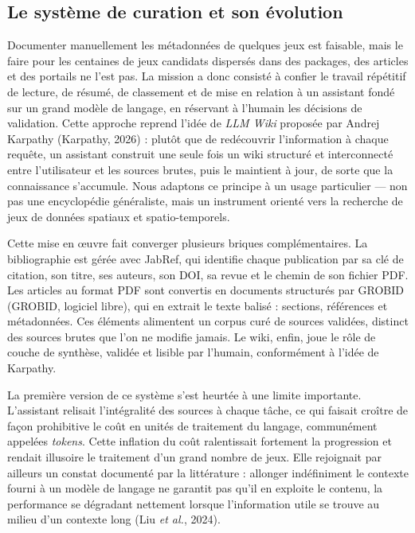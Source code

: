 \documentclass[11pt,a4paper]{article}
\begin{document}
\subsection{Le système de curation et son évolution}

Documenter manuellement les métadonnées de quelques jeux est faisable, mais le faire pour les centaines de jeux candidats dispersés dans des packages, des articles et des portails ne l'est pas. La mission a donc consisté à confier le travail répétitif de lecture, de résumé, de classement et de mise en relation à un assistant fondé sur un grand modèle de langage, en réservant à l'humain les décisions de validation. Cette approche reprend l'idée de \textit{LLM Wiki} proposée par Andrej Karpathy (Karpathy, 2026) : plutôt que de redécouvrir l'information à chaque requête, un assistant construit une seule fois un wiki structuré et interconnecté entre l'utilisateur et les sources brutes, puis le maintient à jour, de sorte que la connaissance s'accumule. Nous adaptons ce principe à un usage particulier --- non pas une encyclopédie généraliste, mais un instrument orienté vers la recherche de jeux de données spatiaux et spatio-temporels.

Cette mise en \oe uvre fait converger plusieurs briques complémentaires. La bibliographie est gérée avec JabRef, qui identifie chaque publication par sa clé de citation, son titre, ses auteurs, son DOI, sa revue et le chemin de son fichier PDF. Les articles au format PDF sont convertis en documents structurés par GROBID (GROBID, logiciel libre), qui en extrait le texte balisé : sections, références et métadonnées. Ces éléments alimentent un corpus curé de sources validées, distinct des sources brutes que l'on ne modifie jamais. Le wiki, enfin, joue le rôle de couche de synthèse, validée et lisible par l'humain, conformément à l'idée de Karpathy.

La première version de ce système s'est heurtée à une limite importante. L'assistant relisait l'intégralité des sources à chaque tâche, ce qui faisait croître de façon prohibitive le coût en unités de traitement du langage, communément appelées \textit{tokens}. Cette inflation du coût ralentissait fortement la progression et rendait illusoire le traitement d'un grand nombre de jeux. Elle rejoignait par ailleurs un constat documenté par la littérature : allonger indéfiniment le contexte fourni à un modèle de langage ne garantit pas qu'il en exploite le contenu, la performance se dégradant nettement lorsque l'information utile se trouve au milieu d'un contexte long (Liu \textit{et al.}, 2024).
\end{document}
